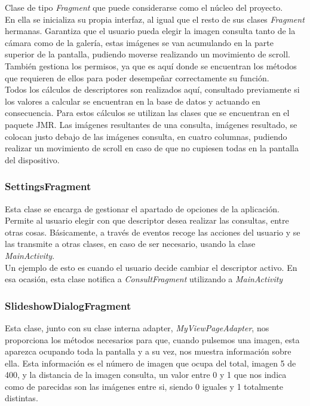 Clase de tipo \textit{Fragment} que puede considerarse como el núcleo del proyecto.\\

En ella se inicializa su propia interfaz, al igual que el resto de sus clases \textit{Fragment} hermanas. Garantiza que el usuario pueda elegir la imagen consulta tanto de la cámara como de la galería, estas imágenes se van acumulando en la parte superior de la pantalla, pudiendo moverse realizando un movimiento de scroll. También gestiona los permisos, ya que es aquí donde se encuentran los métodos que requieren de ellos para poder desempeñar correctamente su función.\\

Todos los cálculos de descriptores son realizados aquí, consultado previamente si los valores a calcular se encuentran en la base de datos y actuando en consecuencia. Para estos cálculos se utilizan las clases que se encuentran en el paquete JMR. Las imágenes resultantes de una consulta, imágenes resultado, se colocan justo debajo de las imágenes consulta, en cuatro columnas, pudiendo realizar un movimiento de scroll en caso de que no cupiesen todas en la pantalla del dispositivo.

\subsubsection{SettingsFragment}

Esta clase se encarga de gestionar el apartado de opciones de la aplicación. Permite al usuario elegir con que descriptor desea realizar las consultas, entre otras cosas. Básicamente, a través de eventos recoge las acciones del usuario y se las transmite a otras clases, en caso de ser necesario, usando la clase \textit{MainActivity}.\\

Un ejemplo de esto es cuando el usuario decide cambiar el descriptor activo. En esa ocasión, esta clase notifica a \textit{ConsultFragment} utilizando a \textit{MainActivity}

\subsubsection{SlideshowDialogFragment}

Esta clase, junto con su clase interna adapter, \textit{MyViewPageAdapter}, nos proporciona los métodos necesarios para que, cuando pulsemos una imagen, esta aparezca ocupando toda la pantalla y a su vez, nos muestra información sobre ella. Esta información es el número de imagen que ocupa del total, imagen 5 de 400, y la distancia de la imagen consulta, un valor entre 0 y 1 que nos indica como de parecidas son las imágenes entre si, siendo 0 iguales y 1 totalmente distintas.


